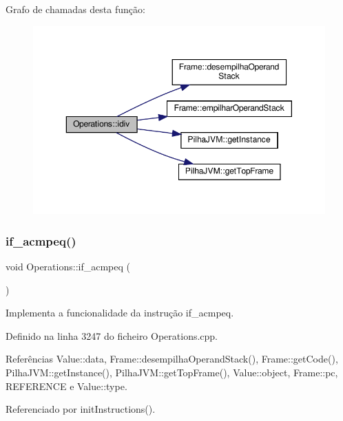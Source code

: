Grafo de chamadas desta função\+:
\nopagebreak
\begin{figure}[H]
\begin{center}
\leavevmode
\includegraphics[width=350pt]{classOperations_a5bf24c3cc02a8282c21a37cd7b7ba5d3_cgraph}
\end{center}
\end{figure}
\mbox{\label{classOperations_aa0432645b0d0effb4d4d839ea2dcec1c}} 
\subsubsection{\texorpdfstring{if\+\_\+acmpeq()}{if\_acmpeq()}}
{\footnotesize\ttfamily void Operations\+::if\+\_\+acmpeq (\begin{DoxyParamCaption}{ }\end{DoxyParamCaption})\hspace{0.3cm}{\ttfamily [private]}}



Implementa a funcionalidade da instrução if\+\_\+acmpeq. 



Definido na linha 3247 do ficheiro Operations.\+cpp.



Referências Value\+::data, Frame\+::desempilha\+Operand\+Stack(), Frame\+::get\+Code(), Pilha\+J\+V\+M\+::get\+Instance(), Pilha\+J\+V\+M\+::get\+Top\+Frame(), Value\+::object, Frame\+::pc, R\+E\+F\+E\+R\+E\+N\+CE e Value\+::type.



Referenciado por init\+Instructions().

